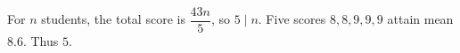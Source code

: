 For $n$ students, the total score is $\dfrac{43n}{5}$, so $5\mid n$. Five scores $8,8,9,9,9$ attain mean 8.6. Thus $\boxed5$.
